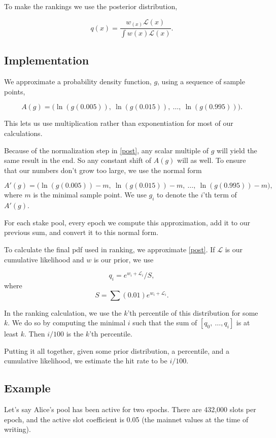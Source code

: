 \documentclass[11pt,a4paper,dvipsnames,twosided]{article}
\begin{document}
To make the rankings we use the posterior distribution,

\begin{equation}
\label{post}
q(x) = \frac{w_(x)\mathcal{L}(x)}{\int w(x)\mathcal{L}(x)}.
\end{equation}

\subsection{Implementation}

We approximate a probability density function, $g$, using a sequence of sample points,

\[ A(g) = \big(\ln(g(0.005)),~ \ln(g(0.015)),~ \ldots,~ \ln(g(0.995))\big). \]

This lets us use multiplication rather than exponentiation for most of our calculations.

Because of the normalization step in \eqref{post}, any scalar multiple of $g$
will yield the same result in the end. So any constant shift of $A(g)$ will as well.
To ensure that our numbers don't grow too large, we use the normal form

\[ A'(g) = \big(\ln(g(0.005)) - m,~ \ln(g(0.015)) - m,~ \ldots,~ \ln(g(0.995)) - m\big), \]
where $m$ is the minimal sample point. We use $g_i$ to denote the $i$'th term of $A'(g)$.

For each stake pool, every epoch we compute this approximation, add it to our previous sum, and convert it to this normal form.

To calculate the final pdf used in ranking, we approximate \eqref{post}.
If $\mathcal{L}$ is our cumulative likelihood
and $w$ is our prior, we use

\[ q_i = e^{w_i + \mathcal{L}_i} / S, \]
where
\[ S = \sum (0.01) e^{w_i + \mathcal{L}_i}. \]

In the ranking calculation, we use the $k$'th percentile of this distribution for some $k$.
We do so by computing the minimal $i$ such that the sum of $[q_0,~\ldots,q_i]$ is at least $k$.
Then $i/100$ is the $k$'th percentile.

Putting it all together, given some prior distribution,
a percentile, and a cumulative likelihood,
we estimate the hit rate to be $i/100$.


\subsection{Example}

Let's say Alice's pool has been active for two epochs.
There are 432,000 slots per epoch, and the active slot coefficient is 0.05
(the mainnet values at the time of writing).
\end{document}
